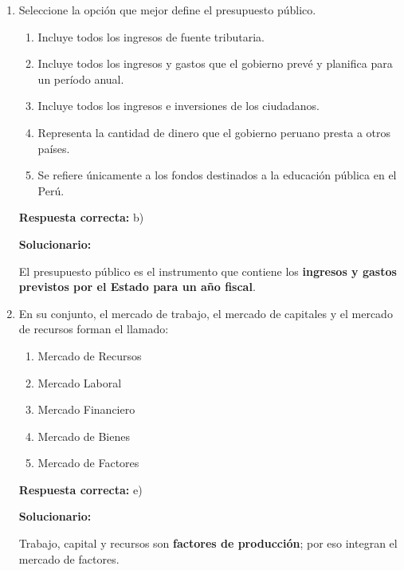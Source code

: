 \begin{enumerate}[resume]
	
	\vspace{6mm}
	
	\item Seleccione la opción que mejor define el presupuesto público.
	\begin{enumerate}[label=\alph*)]
		\item Incluye todos los ingresos de fuente tributaria.
		\item Incluye todos los ingresos y gastos que el gobierno prevé y planifica para un período anual.
		\item Incluye todos los ingresos e inversiones de los ciudadanos.
		\item Representa la cantidad de dinero que el gobierno peruano presta a otros países.
		\item Se refiere únicamente a los fondos destinados a la educación pública en el Perú.
	\end{enumerate}
	\textbf{Respuesta correcta:} b)
	
	\vspace{2mm}
	\textbf{Solucionario:}
	
	El presupuesto público es el instrumento que contiene los \textbf{ingresos y gastos previstos por el Estado para un año fiscal}.
	

	
	\vspace{6mm}
	
	\item En su conjunto, el mercado de trabajo, el mercado de capitales y el mercado de recursos forman el llamado:
	\begin{enumerate}[label=\alph*)]
		\item Mercado de Recursos
		\item Mercado Laboral
		\item Mercado Financiero
		\item Mercado de Bienes
		\item Mercado de Factores
	\end{enumerate}
	\textbf{Respuesta correcta:} e)
	
	\vspace{2mm}
	\textbf{Solucionario:}
	
	Trabajo, capital y recursos son \textbf{factores de producción}; por eso integran el mercado de factores.
	

	
	\vspace{6mm}
\end{enumerate}

